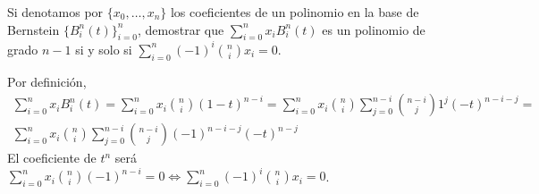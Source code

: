 \documentclass[twoside]{article}
\begin{document}
\newpage

\begin{ejercicio}{3.2}
Si denotamos por $\{x_0,\dots,x_n\}$ los coeficientes de un polinomio en la base de Bernstein $\{B^n_i(t)\}_{i=0}^n$, demostrar que $\sum_{i=0}^nx_iB_i^n(t)$ es un polinomio de grado $n-1$ si y solo si $\sum_{i=0}^n(-1)^i\binom{n}{i}x_i=0$.
\end{ejercicio}
\begin{solucion}
Por definición, 
\begin{gather*}
\sum_{i=0}^nx_iB_i^n(t)=\sum_{i=0}^nx_i\binom{n}{i}(1-t)^{n-i}=\sum_{i=0}^nx_i\binom{n}{i}\sum_{j=0}^{n-i}\binom{n-i}{j}1^j(-t)^{n-i-j}=\\
\sum_{i=0}^nx_i\binom{n}{i}\sum_{j=0}^{n-i}\binom{n-i}{j}(-1)^{n-i-j}(-t)^{n-j}
\end{gather*}
El coeficiente de $t^n$ será $\sum_{i=0}^nx_i\binom{n}{i}(-1)^{n-i}=0\Leftrightarrow\sum_{i=0}^n(-1)^i\binom{n}{i}x_i=0$.
\end{solucion}
\end{document}
